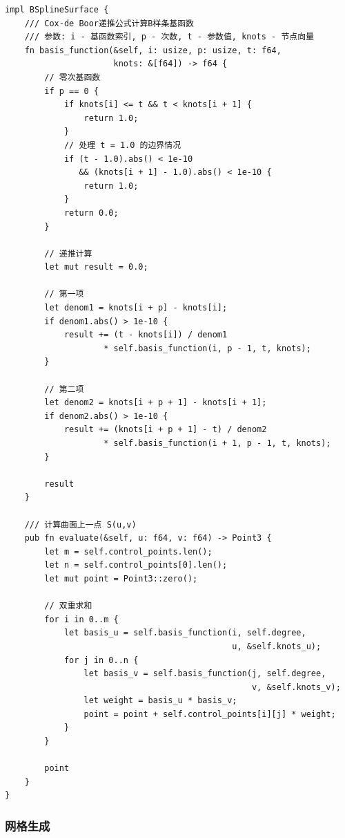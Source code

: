 \documentclass[12pt,a4paper]{article}
\begin{document}
\begin{lstlisting}[style=ruststyle, caption={Cox-de Boor递推算法}]
impl BSplineSurface {
    /// Cox-de Boor递推公式计算B样条基函数
    /// 参数: i - 基函数索引, p - 次数, t - 参数值, knots - 节点向量
    fn basis_function(&self, i: usize, p: usize, t: f64, 
                      knots: &[f64]) -> f64 {
        // 零次基函数
        if p == 0 {
            if knots[i] <= t && t < knots[i + 1] {
                return 1.0;
            }
            // 处理 t = 1.0 的边界情况
            if (t - 1.0).abs() < 1e-10 
               && (knots[i + 1] - 1.0).abs() < 1e-10 {
                return 1.0;
            }
            return 0.0;
        }

        // 递推计算
        let mut result = 0.0;

        // 第一项
        let denom1 = knots[i + p] - knots[i];
        if denom1.abs() > 1e-10 {
            result += (t - knots[i]) / denom1 
                    * self.basis_function(i, p - 1, t, knots);
        }

        // 第二项
        let denom2 = knots[i + p + 1] - knots[i + 1];
        if denom2.abs() > 1e-10 {
            result += (knots[i + p + 1] - t) / denom2 
                    * self.basis_function(i + 1, p - 1, t, knots);
        }

        result
    }

    /// 计算曲面上一点 S(u,v)
    pub fn evaluate(&self, u: f64, v: f64) -> Point3 {
        let m = self.control_points.len();
        let n = self.control_points[0].len();
        let mut point = Point3::zero();

        // 双重求和
        for i in 0..m {
            let basis_u = self.basis_function(i, self.degree, 
                                              u, &self.knots_u);
            for j in 0..n {
                let basis_v = self.basis_function(j, self.degree, 
                                                  v, &self.knots_v);
                let weight = basis_u * basis_v;
                point = point + self.control_points[i][j] * weight;
            }
        }

        point
    }
}
\end{lstlisting}

\subsubsection{网格生成}
\end{document}
